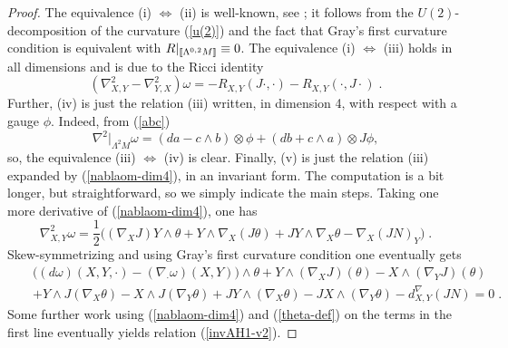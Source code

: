 \documentclass{amsart}
\newcommand{\na}{\nabla}
\newcommand{\La}{\Lambda}
\newcommand{\leftr}{[\hbox{\hspace{-0.15em}}[}
\newcommand{\rightr}{]\hbox{\hspace{-0.15em}}]}
\begin{document}
\begin{proof} The equivalence (i) $\Leftrightarrow$ (ii) is well-known, see \cite{TV}; it follows from the $U(2)$-decomposition of the curvature (\ref{u(2)}) and the fact that Gray's first curvature condition is equivalent with $R|_{\leftr \La^{0,2}M \rightr} \equiv 0$. The equivalence (i) $\Leftrightarrow$ (iii)  holds in all dimensions and is due to the Ricci identity
\begin{equation*} 
( \nabla^2_{X,Y} -  \nabla^2_{Y,X} )\omega = -R_{X,Y}(J\cdot, \cdot) -R_{X,Y}(\cdot, J\cdot) \; .
\end{equation*}
Further, (iv) is just the relation (iii) written, in dimension 4, with respect with a gauge $\phi$. Indeed,  from (\ref{abc})
$$\na ^2|_{\Lambda^2 M}\omega =(da - c\wedge b)\otimes \phi + (db + c\wedge a)\otimes J\phi, $$ 
so, the equivalence (iii) $\Leftrightarrow$ (iv) is clear. Finally, (v) is just the relation (iii) expanded by (\ref{nablaom-dim4}), in an invariant form. The computation is a bit longer, but straightforward, so we simply indicate the main steps.
Taking one more derivative of (\ref{nablaom-dim4}), one has
\begin{equation*} 
\nabla^2_{X ,Y} \omega = \frac{1}{2} \Big( (\nabla_X J )Y \wedge \theta + Y \wedge \nabla_X(J \theta) + JY \wedge \nabla_X \theta - \nabla_X (JN)_Y  \Big) \; .
\end{equation*}
Skew-symmetrizing and using Gray's first curvature condition one eventually gets 
\begin{eqnarray*} 
    & & \big( (d \omega)(X,Y, \cdot) - (\nabla_{\cdot} \omega)(X,Y) \big) \wedge \theta 
      + Y \wedge (\nabla_X J)(\theta) - X \wedge (\nabla_Y J)(\theta) \\ \nonumber
      & & + Y \wedge J(\nabla_X \theta) - X \wedge J(\nabla_Y \theta) + JY \wedge (\nabla_X \theta) - JX \wedge (\nabla_Y \theta) - d^{\nabla}_{X,Y}(JN)  = 0\; .
\end{eqnarray*} 
Some further work using (\ref{nablaom-dim4}) and (\ref{theta-def}) on the terms in the first line eventually yields relation (\ref{invAH1-v2}).
\end{proof}
\end{document}
